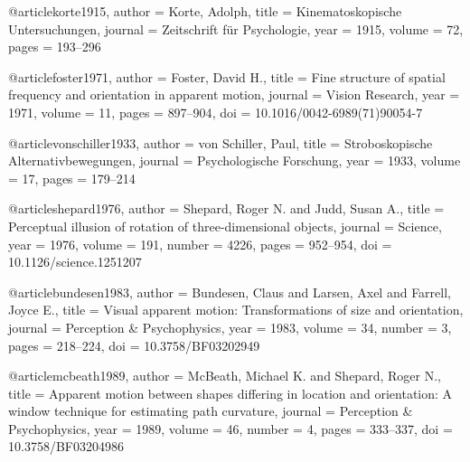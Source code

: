 
@article{korte1915,
  author    = {Korte, Adolph},
  title     = {Kinematoskopische {U}ntersuchungen},
  journal   = {Zeitschrift f{\"u}r Psychologie},
  year      = {1915},
  volume    = {72},
  pages     = {193--296}
}

@article{foster1971,
  author    = {Foster, David H.},
  title     = {Fine structure of spatial frequency and orientation
               in apparent motion},
  journal   = {Vision Research},
  year      = {1971},
  volume    = {11},
  pages     = {897--904},
  doi       = {10.1016/0042-6989(71)90054-7}
}

@article{vonschiller1933,
  author    = {{von Schiller}, Paul},
  title     = {Stroboskopische {A}lternativbewegungen},
  journal   = {Psychologische Forschung},
  year      = {1933},
  volume    = {17},
  pages     = {179--214}
}

@article{shepard1976,
  author    = {Shepard, Roger N. and Judd, Susan A.},
  title     = {Perceptual illusion of rotation of three-dimensional objects},
  journal   = {Science},
  year      = {1976},
  volume    = {191},
  number    = {4226},
  pages     = {952--954},
  doi       = {10.1126/science.1251207}
}

@article{bundesen1983,
  author    = {Bundesen, Claus and Larsen, Axel and Farrell, Joyce E.},
  title     = {Visual apparent motion: Transformations of size and orientation},
  journal   = {Perception \& Psychophysics},
  year      = {1983},
  volume    = {34},
  number    = {3},
  pages     = {218--224},
  doi       = {10.3758/BF03202949}
}

@article{mcbeath1989,
  author    = {McBeath, Michael K. and Shepard, Roger N.},
  title     = {Apparent motion between shapes differing in location and
               orientation: {A} window technique for estimating path curvature},
  journal   = {Perception \& Psychophysics},
  year      = {1989},
  volume    = {46},
  number    = {4},
  pages     = {333--337},
  doi       = {10.3758/BF03204986}
}
